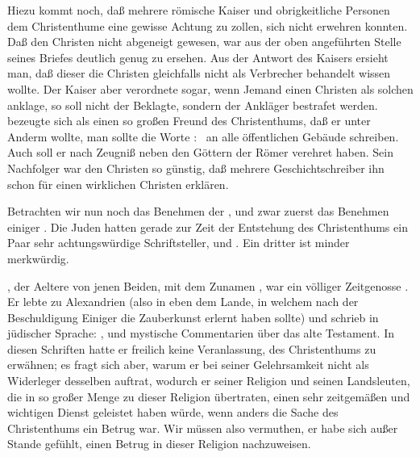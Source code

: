 \begin{aufza}
\begin{aufzb}
\item Hiezu kommt noch, daß mehrere römische Kaiser und obrigkeitliche Personen dem Christenthume eine gewisse Achtung zu zollen, sich nicht erwehren konnten. Daß  den Christen nicht abgeneigt gewesen, war aus der oben angeführten Stelle seines Briefes deutlich genug zu ersehen. Aus der Antwort des Kaisers  ersieht man, daß dieser die Christen gleichfalls nicht als Verbrecher behandelt wissen wollte. Der Kaiser  aber verordnete sogar, wenn Jemand einen Christen als solchen anklage, so soll nicht der Beklagte, sondern der Ankläger bestrafet werden.  bezeugte sich als einen so großen Freund des Christenthums, daß er unter Anderm wollte, man sollte die Worte :  \usw\ an alle öffentlichen Gebäude schreiben. Auch soll er nach  Zeugniß neben den Göttern der Römer  verehret haben. Sein Nachfolger  war den Christen so günstig, daß mehrere Geschichtschreiber ihn schon für einen wirklichen Christen erklären.
\end{aufzb}
\item Betrachten wir nun noch das Benehmen der , und zwar zuerst das Benehmen einiger . Die Juden hatten gerade zur Zeit der Entstehung des Christenthums ein Paar sehr achtungswürdige Schriftsteller,  und . Ein dritter  ist minder merkwürdig.~
\begin{aufzb}
\item {}, der Aeltere von jenen Beiden, mit dem Zunamen , war ein völliger Zeitgenosse . Er lebte zu Alexandrien (also in eben dem Lande, in welchem  nach der Beschuldigung Einiger die Zauberkunst erlernt haben sollte) und schrieb in jüdischer Sprache: , und mystische Commentarien über das alte Testament. In diesen Schriften hatte er freilich keine Veranlassung, des Christenthums zu erwähnen; es fragt sich aber, warum er bei seiner Gelehrsamkeit nicht als Widerleger desselben auftrat, wodurch er seiner Religion und seinen Landsleuten, die in so großer Menge zu dieser Religion übertraten, einen sehr zeitgemäßen und wichtigen Dienst geleistet haben würde, wenn anders die Sache des Christenthums ein Betrug war. Wir müssen also vermuthen, er habe sich außer Stande gefühlt, einen Betrug in dieser Religion nachzuweisen.

\end{aufzb}
\end{aufza}
